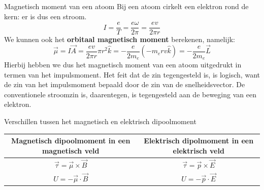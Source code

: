 \begin{app}{Magnetisch moment van een atoom}
    Bij een atoom cirkelt een elektron rond de kern: er is dus een stroom.
    \begin{equation*}
        I = \dfrac{e}{T} = \dfrac{e\omega}{2\pi} = \dfrac{ev}{2\pi r}
    \end{equation*}
    We kunnen ook het \textbf{orbitaal magnetisch moment} berekenen, namelijk: 
    \begin{equation*}
        \Vec{\mu} = I\Vec{A} = \dfrac{ev}{2\pi r} \pi r^{2} \hat{k} = -\dfrac{e}{2m_{e}}(-m_{e}rv\hat{k}) = -\dfrac{e}{2m_{e}}\Vec{L}
    \end{equation*}
    Hierbij hebben we dus het magnetisch moment van een atoom uitgedrukt in termen van het impulsmoment.
    Het feit dat de zin tegengesteld is, is logisch, want de zin van het impulsmoment bepaald door de zin van de snelheidsvector.
    De conventionele stroomzin is, daarentegen, is tegengesteld aan de beweging van een elektron.
\end{app}
\newpage

\begin{vrg}{Verschillen tussen het magnetisch en elektrisch dipoolmoment}
    \vspace{-0.3cm}
    \def\arraystretch{2}
    \centering
    \begin{tabular}{c|c}
       Magnetisch dipoolmoment in een magnetisch veld & Elektrisch dipolmoment in een elektrisch veld \\ \hline
        $\Vec{\tau} = \Vec{\mu} \times \Vec{B}$ & $\Vec{\tau} = \Vec{p} \times \Vec{E}$ \\ \hline
        $U = -\Vec{\mu} \cdot \Vec{B}$ & $U = -\Vec{p} \cdot \Vec{E}$ \\
    \end{tabular}
\end{vrg}

